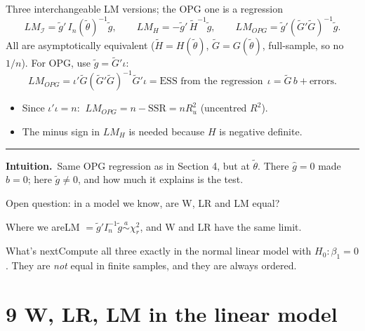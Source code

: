 \documentclass[aspectratio=169,11pt,t]{beamer}
\newcommand{\cI}{\mathcal{I}}          %
\newcommand{\In}{I_{n}}                %
\newcommand{\tth}{\tilde\theta}
\newcommand{\asim}{\overset{a}{\sim}}
\newcommand{\intuition}[1]{\par\vfill
  {\color{intu}\rule{\linewidth}{0.4pt}}\par\vspace{1pt}
  {\small\color{intu}\textbf{Intuition.}\ #1}\par\vspace{2pt}}
\newcommand{\bridge}[3]{%
  \begin{frame}{#1}
  \vspace{4pt}
  \begin{block}{Where we are}#2\end{block}
  \begin{exampleblock}{What's next}#3\end{exampleblock}
  \end{frame}}
\begin{document}
\begin{frame}{Three interchangeable LM versions; the OPG one is a regression}
\[ LM_{\cI}=\tilde g'\,\In(\tth)^{-1}\tilde g,\qquad
   LM_{H}=-\tilde g'\,\tilde H^{-1}\tilde g,\qquad
   LM_{OPG}=\tilde g'(\tilde G'\tilde G)^{-1}\tilde g . \]
All are asymptotically equivalent ($\tilde H=H(\tth)$, $\tilde G=G(\tth)$, full-sample, so no $1/n$). For OPG, use $\tilde g=\tilde G'\iota$:
\[ LM_{OPG}=\iota'\tilde G(\tilde G'\tilde G)^{-1}\tilde G'\iota
 =\text{ESS from the regression}\ \ \iota=\tilde G\,b+\text{errors}. \]
\begin{itemize}
 \item Since $\iota'\iota=n$: $\ LM_{OPG}=n-\mathrm{SSR}=nR^{2}_{u}$ (uncentred $R^{2}$).
 \item The minus sign in $LM_{H}$ is needed because $H$ is negative definite.
\end{itemize}
\intuition{Same OPG regression as in Section 4, but at $\tth$. There $\hat g=0$ made $b=0$; here $\tilde g\neq0$, and how much it explains is the test.}
\end{frame}

\bridge{Open question: in a model we know, are W, LR and LM equal?}
{LM $=\tilde g'\In^{-1}\tilde g\asim\chi^{2}_{r}$, and W and LR have the same limit.}
{Compute all three exactly in the normal linear model with $H_{0}\colon\beta_{1}=0$. They are \emph{not} equal in finite samples, and they are always ordered.}

\section{9 W, LR, LM in the linear model}
\end{document}

